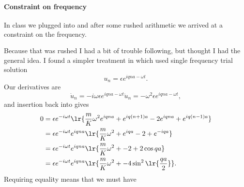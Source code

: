 \paragraph{Constraint on frequency}
%
In class we plugged  into   and after some rushed arithmetic we arrived at a constraint on the frequency.

Because that was rushed I had a bit of trouble following, but thought I had the general idea.  I found a simpler treatment in \citep{kdasgupta:ph409} which used single frequency trial solution
%
\begin{equation}\label{eqn:condensedMatterLecture7Phonons:280}
u_n = \epsilon e^{i q n a - \omega t}.
\end{equation}
%
Our derivatives are
\begin{subequations}
\begin{equation}\label{eqn:condensedMatterLecture7Phonons:300}
\dot{u}_n = -i \omega \epsilon e^{i q n a - \omega t}
\end{equation}
\begin{equation}\label{eqn:condensedMatterLecture7Phonons:320}
\ddot{u}_n = - \omega^2 \epsilon e^{i q n a - \omega t},
\end{equation}
\end{subequations}
%
and insertion back into  gives
%
\begin{equation}\label{eqn:condensedMatterLecture7Phonons:340}
\begin{aligned}
0
&= \epsilon e^{-i\omega t}
\lr{
\frac{m}{K} \omega^2 e^{i q n a} + e^{i q(n + 1) a} - 2 e^{i q n a} + e^{i q (n-1) a}
}
\\ &= \epsilon e^{-i\omega t}
e^{i q n a}
\lr{
\frac{m}{K} \omega^2 + e^{i q a} - 2 + e^{-i q a}
}
\\ &= \epsilon e^{-i\omega t}
e^{i q n a}
\lr{
\frac{m}{K} \omega^2 + -2 + 2 \cos q a
}
\\ &= \epsilon e^{-i\omega t}
e^{i q n a}
\lr{
\frac{m}{K} \omega^2 + - 4 \sin^2 \lr{ \frac{ q a}{2} }
}.
\end{aligned}
\end{equation}
%
Requiring equality means that we must have
